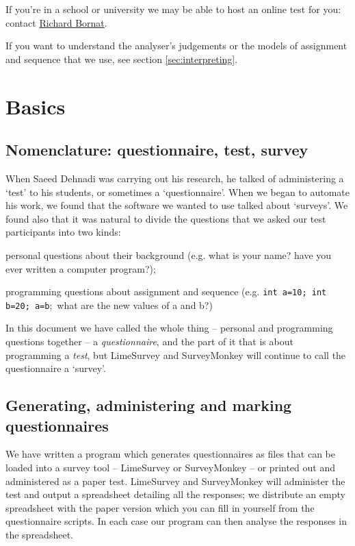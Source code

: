 \documentclass[11pt,a4paper]{article}
\newcommand{\secref}[1]{section \ref{sec:#1}}
\begin{document}
If you're in a school or university we may be able to host an online test for you: contact \href{mailto:R.Bornat@mdx.ac.uk}{Richard Bornat}.

If you want to understand the analyser's judgements or the models of assignment and sequence that we use, see \secref{interpreting}.

\section{Basics}

\subsection{Nomenclature: questionnaire, test, survey}

When Saeed Dehnadi was carrying out his research, he talked of administering a `test' to his students, or sometimes a `questionnaire'. When we began to automate his work, we found that the software we wanted to use talked about `surveys'. We found also that it was natural to divide the questions that we asked our test participants into two kinds: 
\begin{description*}
\item[personal] questions about their background (e.g. what is your name? have you ever written a computer program?);
\item[programming] questions about assignment and sequence (e.g. \texttt{int a=10; int b=20; a=b};\ what are the new values of a and b?) 
\end{description*}

In this document we have called the whole thing -- personal and programming questions together -- a \emph{questionnaire}, and the part of it that is about programming a \emph{test}, but LimeSurvey and SurveyMonkey will continue to call the questionnaire a `survey'.

\subsection{Generating, administering and marking questionnaires}

We have written a program which generates questionnaires as files that can be loaded into a survey tool -- LimeSurvey or SurveyMonkey -- or printed out and administered as a paper test. LimeSurvey and SurveyMonkey will administer the test and output a spreadsheet detailing all the responses; we distribute an empty spreadsheet with the paper version which you can fill in yourself from the questionnaire scripts. In each case our program can then analyse the responses in the spreadsheet.
\end{document}
